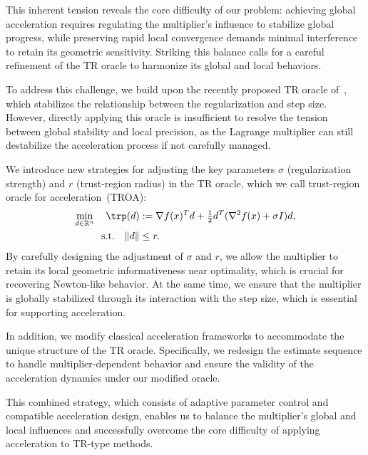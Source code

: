 This inherent tension reveals the core difficulty of our problem: achieving global acceleration requires regulating the multiplier’s influence to stabilize global progress, while preserving rapid local convergence demands minimal interference to retain its geometric sensitivity. Striking this balance calls for a careful refinement of the TR oracle to harmonize its global and local behaviors.

To address this challenge, we build upon the recently proposed TR oracle of~\citet{jiang2024nonconvexityuniversaltrustregionmethod}, which stabilizes the relationship between the regularization and step size. However, directly applying this oracle is insufficient to resolve the tension between global stability and local precision, as the Lagrange multiplier can still destabilize the acceleration process if not carefully managed.

We introduce new strategies for adjusting the key parameters $\sigma$ (regularization strength) and $r$ (trust-region radius) in the TR oracle, which we call trust-region oracle for acceleration~(TROA):
\begin{subequations}\label{eq.newTR}
    \begin{align}
        \min_{d \in \mathbb{R}^n} \quad \trp(d) & := \nabla f(x)^T d + \tfrac{1}{2} d^T (\nabla^2 f(x) + \sigma I) d, \\\label{eq.sa.ballconstraint}
        \text{s.t.} \quad \|d\|                 & \le r.
    \end{align}
\end{subequations}
By carefully designing the adjustment of $\sigma$ and $r$, we allow the multiplier to retain its local geometric informativeness near optimality, which is crucial for recovering Newton-like behavior. At the same time, we ensure that the multiplier is globally stabilized through its interaction with the step size, which is essential for supporting acceleration.

In addition, we modify classical acceleration frameworks to accommodate the unique structure of the TR oracle. Specifically, we redesign the estimate sequence to handle multiplier-dependent behavior and ensure the validity of the acceleration dynamics under our modified oracle.

This combined strategy, which consists of adaptive parameter control and compatible acceleration design, enables us to balance the multiplier’s global and local influences and successfully overcome the core difficulty of applying acceleration to TR-type methods.

